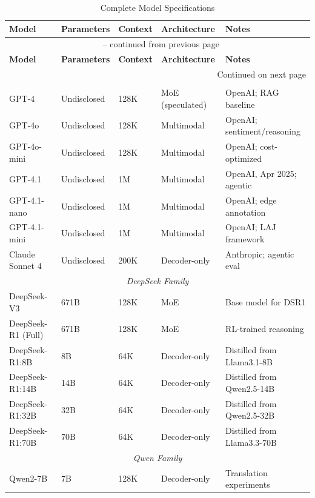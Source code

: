 \begin{longtable}{@{}p{3.5cm}p{1.8cm}p{2cm}p{2.2cm}p{3cm}@{}}
\caption{Complete Model Specifications} \label{tab:full_model_specs} \\
\toprule
\textbf{Model} & \textbf{Parameters} & \textbf{Context} & \textbf{Architecture} & \textbf{Notes} \\
\midrule
\endfirsthead
\multicolumn{5}{c}{{\tablename\ \thetable{} -- continued from previous page}} \\
\toprule
\textbf{Model} & \textbf{Parameters} & \textbf{Context} & \textbf{Architecture} & \textbf{Notes} \\
\midrule
\endhead
\midrule
\multicolumn{5}{r}{{Continued on next page}} \\
\endfoot
\bottomrule
\endlastfoot
\multicolumn{5}{c}{\textit{Proprietary Models (Comparison Baselines)}} \\
\midrule
GPT-4 & Undisclosed & 128K & MoE (speculated) & OpenAI; RAG baseline \\
GPT-4o & Undisclosed & 128K & Multimodal & OpenAI; sentiment/reasoning \\
GPT-4o-mini & Undisclosed & 128K & Multimodal & OpenAI; cost-optimized \\
GPT-4.1 & Undisclosed & 1M & Multimodal & OpenAI, Apr 2025; agentic \\
GPT-4.1-nano & Undisclosed & 1M & Multimodal & OpenAI; edge annotation \\
GPT-4.1-mini & Undisclosed & 1M & Multimodal & OpenAI; LAJ framework \\
Claude Sonnet 4 & Undisclosed & 200K & Decoder-only & Anthropic; agentic eval \\
\midrule
\multicolumn{5}{c}{\textit{DeepSeek Family}} \\
\midrule
DeepSeek-V3 & 671B & 128K & MoE & Base model for DSR1 \\
DeepSeek-R1 (Full) & 671B & 128K & MoE & RL-trained reasoning \\
DeepSeek-R1:8B & 8B & 64K & Decoder-only & Distilled from Llama3.1-8B \\
DeepSeek-R1:14B & 14B & 64K & Decoder-only & Distilled from Qwen2.5-14B \\
DeepSeek-R1:32B & 32B & 64K & Decoder-only & Distilled from Qwen2.5-32B \\
DeepSeek-R1:70B & 70B & 64K & Decoder-only & Distilled from Llama3.3-70B \\
\midrule
\multicolumn{5}{c}{\textit{Qwen Family}} \\
\midrule
Qwen2-7B & 7B & 128K & Decoder-only & Translation experiments \\

\end{longtable}
